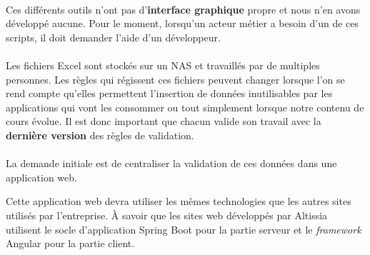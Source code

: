 \paragraph{}
Ces différents outils n'ont pas d'\textbf{interface graphique} propre et nous n'en avons développé aucune.
Pour le moment, lorsqu'un acteur métier a besoin d'un de ces scripts, il doit demander l'aide d'un développeur.

\paragraph{}
Les fichiers Excel sont stockés sur un NAS\fnmark{} et travaillés par de multiples personnes.
Les règles qui régissent ces fichiers peuvent changer lorsque l'on se rend compte qu'elles permettent l'insertion de données inutilisables par les applications qui vont les consommer ou tout simplement lorsque notre contenu de cours évolue.
Il est donc important que chacun valide son travail avec la \textbf{dernière version} des règles de validation.


\paragraph{}
La demande initiale est de centraliser la validation de ces données dans une application web.

Cette application web devra utiliser les mêmes technologies que les autres sites utilisés par l'entreprise. À savoir que les sites web développés par Altissia utilisent le socle d'application Spring Boot pour la partie serveur et le \textit{framework} Angular pour la partie client\fnmark{}.


